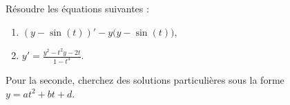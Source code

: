 

\begin{exercice}\label{exo_II-1-09}

Résoudre les équations suivantes :
\begin{enumerate}
\item $(y-\sin(t))'-y\big(y-\sin(t)\big)$,
\item $y'=\frac{ y^2-t^2y-2t }{ 1-t^3 }$.
\end{enumerate}
Pour la seconde, cherchez des solutions particulières sous la forme $y=at^2+bt+d$.

\end{exercice}

